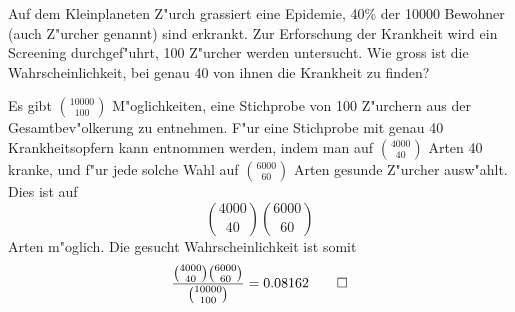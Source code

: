 Auf dem Kleinplaneten Z"urch grassiert eine Epidemie, 40\% der 10000 Bewohner
(auch Z"urcher genannt) sind
erkrankt. Zur Erforschung der Krankheit wird ein Screening durchgef"uhrt,
100 Z"urcher werden untersucht. Wie gross ist die Wahrscheinlichkeit,
bei genau 40 von ihnen die Krankheit zu finden?

\begin{loesung}
Es gibt $\binom{10000}{100}$ M"oglichkeiten, eine Stichprobe von
100 Z"urchern aus der Gesamtbev"olkerung zu entnehmen. F"ur eine
Stichprobe mit genau 40 Krankheitsopfern kann entnommen
werden, indem man auf
$\binom{4000}{40}$ Arten 40 kranke, und f"ur jede solche Wahl
auf $\binom{6000}{60}$ Arten
gesunde Z"urcher ausw"ahlt. Dies ist auf
\[
\binom{4000}{40}\binom{6000}{60}
\]
Arten m"oglich.
Die gesucht Wahrscheinlichkeit ist somit
\[
\frac{\binom{4000}{40}\binom{6000}{60}}{\binom{10000}{100}}=
0.08162
\qedhere
\]
\end{loesung}

